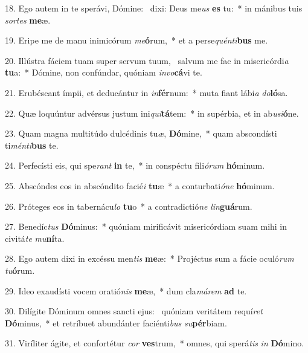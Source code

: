 18. Ego autem in te sperávi, Dómine: \dag\  dixi: Deus me\textit{us} \textbf{es} tu:~*  in mánibus tuis \textit{sor}\textit{tes} \textbf{me}æ.\

19. Eripe me de manu inimicórum \textit{me}\textbf{ó}rum,~*  et a perse\textit{quén}\textit{ti}\textbf{bus} me.\

20. Illústra fáciem tuam super servum tuum, \dag\  salvum me fac in misericórdi\textit{a} \textbf{tu}a:~*  Dómine, non confúndar, quóniam \textit{in}\textit{vo}\textbf{cá}vi te.\

21. Erubéscant ímpii, et deducántur in \textit{in}\textbf{fér}num:~*  muta fiant lábi\textit{a} \textit{do}\textbf{ló}sa.\

22. Quæ loquúntur advérsus justum ini\textit{qui}\textbf{tá}tem:~*  in supérbia, et in ab\textit{u}\textit{si}\textbf{ó}ne.\

23. Quam magna multitúdo dulcédinis tu\textit{æ}, \textbf{Dó}mine,~*  quam abscondísti ti\textit{mén}\textit{ti}\textbf{bus} te.\

24. Perfecísti eis, qui spe\textit{rant} \textbf{in} te,~*  in conspéctu fili\textit{ó}\textit{rum} \textbf{hó}minum.\

25. Abscóndes eos in abscóndito facié\textit{i} \textbf{tu}æ~*  a conturbati\textit{ó}\textit{ne} \textbf{hó}minum.\

26. Próteges eos in tabernácu\textit{lo} \textbf{tu}o~*  a contradictió\textit{ne} \textit{lin}\textbf{guá}rum.\

27. Benedíc\textit{tus} \textbf{Dó}minus:~*  quóniam mirificávit misericórdiam suam mihi in civitá\textit{te} \textit{mu}\textbf{ní}ta.\

28. Ego autem dixi in excéssu men\textit{tis} \textbf{me}æ:~*  Projéctus sum a fácie oculó\textit{rum} \textit{tu}\textbf{ó}rum.\

29. Ideo exaudísti vocem oratió\textit{nis} \textbf{me}æ,~*  dum cla\textit{má}\textit{rem} \textbf{ad} te.\

30. Dilígite Dóminum omnes sancti ejus: \dag\  quóniam veritátem requí\textit{ret} \textbf{Dó}minus,~*  et retríbuet abundánter faciénti\textit{bus} \textit{su}\textbf{pér}biam.\

31. Viríliter ágite, et confortétur \textit{cor} \textbf{ves}trum,~*  omnes, qui sperá\textit{tis} \textit{in} \textbf{Dó}mino.\

